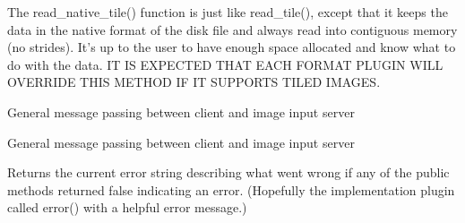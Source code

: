 The {\kw read_native_tile()} function is just like {\kw read_tile()}, 
except that it keeps the data in the native format of the disk file and
always read into contiguous memory (no strides).  It's up to the user to
have enough space allocated and know what to do with the data.  IT IS
EXPECTED THAT EACH FORMAT PLUGIN WILL OVERRIDE THIS METHOD IF IT
SUPPORTS TILED IMAGES.
\apiend

General message passing between client and image input server
\apiend

General message passing between client and image input server
\apiend

Returns the current error string describing what went wrong if
any of the public methods returned {\kw false} indicating an error.
(Hopefully the implementation plugin called {\kw error()} with a
helpful error message.)
\apiend




\chapwidthend
